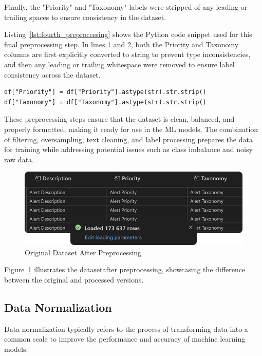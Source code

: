 Finally, the "Priority" and "Taxonomy" labels were stripped of any leading or trailing spaces to ensure consistency in the dataset. 

Listing~\ref{lst:fourth_preprocessing} shows the Python code snippet used for this final preprocessing step.
In lines 1 and 2, both the Priority and Taxonomy columns are first explicitly converted to string to prevent type inconsistencies, and then any leading or trailing whitespace were removed to ensure label consistency across the dataset.

\vspace{0.2cm}
\noindent
\begin{minipage}{\linewidth}
\begin{verbatim}
df["Priority"] = df["Priority"].astype(str).str.strip()
df["Taxonomy"] = df["Taxonomy"].astype(str).str.strip()
\end{verbatim}
\label{lst:fourth_preprocessing}
\end{minipage}
\vspace{0.1cm}

These preprocessing steps ensure that the dataset is clean, balanced, and properly formatted, making it ready for use in the ML models. 
The combination of filtering, oversampling, text cleaning, and label processing prepares the data for training while addressing potential issues such as class imbalance and noisy raw data.

\begin{figure}[h!]
    \centering
    \includegraphics[width=\textwidth]{ch3/assets/dataset_processed.png}
    \caption{Original Dataset After Preprocessing}
    \label{fig:dataset_processed}
\end{figure}

Figure~\ref{fig:dataset_processed} illustrates the dataset\footnotemark[\value{footnote}] after preprocessing, showcasing the difference between the original and processed versions.

\subsection{Data Normalization}
Data normalization typically refers to the process of transforming data into a common scale to improve the performance and accuracy of machine learning models. 


